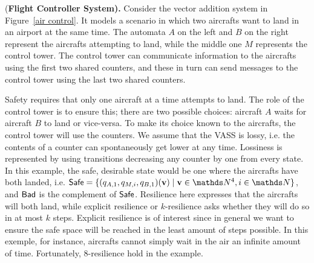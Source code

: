 \begin{example}\label{Example}
{(\bf Flight Controller System).}
Consider the vector addition system in Figure~\ref{air control}. It models a scenario in which two aircrafts want to land in an airport at the same time. 
The automata $A$ on the left and $B$ on the right represent the aircrafts attempting to land, while the middle one $M$ represents the control tower. The control tower can communicate information to the aircrafts using 
the first two shared counters, and these in turn can send messages to the control tower
using the last two shared counters. 

Safety requires that only one aircraft at a time attempts to land. The role of the control tower is to ensure this;
there are two possible choices: aircraft $A$ waits for aircraft $B$ to land
or vice-versa. To make its choice known to the aircrafts, the control tower will use the counters. 
We assume that the VASS is
lossy, i.e. 
 the contents of a counter can spontaneously get lower at any time.
 Lossiness is represented by using transitions decreasing any counter by one from every state. 
In this example, the safe, desirable state would be one where the aircrafts have both landed, i.e.
$\Safe = \{(q_{A,1}, q_{M,i}, q_{B,1})(\textbf{v}) \mid \textbf{v} \in \N^4, i \in \N\}$, and $\textsf{Bad}$ is the complement of $\textsf{Safe}$. 
Resilience here expresses that the aircrafts will both land, while explicit resilience or $k$-resilience asks whether they will do so in at most $k$ steps. 
Explicit resilience is of interest since in general we want to ensure the safe space will 
be reached in
the least amount of steps possible. 
In this exemple, for instance, aircrafts cannot simply wait in the air an infinite amount of time. Fortunately, $8$-resilience hold in the example.
\end{example}




